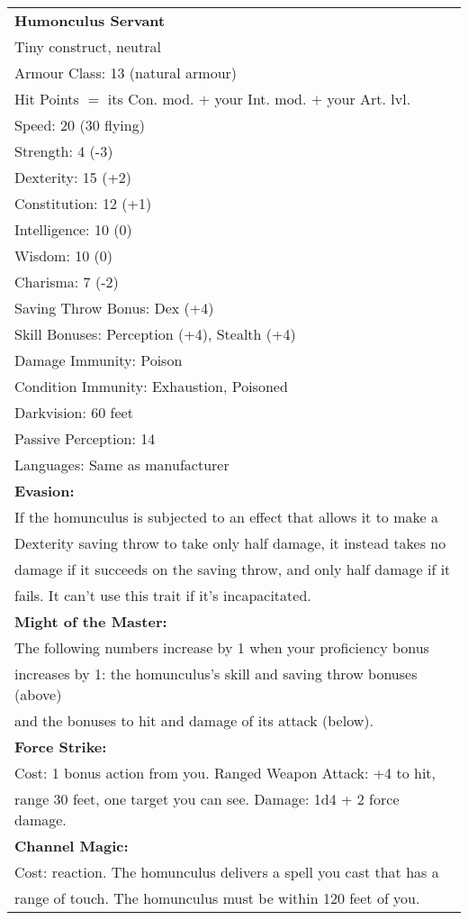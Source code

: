 \documentclass[11pt, A4paper, english]{article}
\begin{document}
			\begin{tabularx}{125.7mm}{|l|}
\hline
{\large \textbf{Humonculus Servant}} \\
Tiny construct, neutral \\
\hline
Armour Class: 13 (natural armour) \\
Hit Points $=$ its Con. mod. $+$ your Int. mod. $+$ your Art. lvl. \\
Speed: 20 (30 flying) \\
Strength: 4 (-3) \\
Dexterity: 15 (+2) \\
Constitution: 12 (+1) \\
Intelligence: 10 (0) \\
Wisdom: 10 (0) \\
Charisma: 7 (-2) \\
Saving Throw Bonus: Dex (+4) \\
Skill Bonuses: Perception (+4), Stealth (+4) \\
Damage Immunity: Poison \\
Condition Immunity: Exhaustion, Poisoned \\
Darkvision: 60 feet \\
Passive Perception: 14 \\
Languages: Same as manufacturer \\
\textbf{Evasion:} \\
If the homunculus is subjected to an effect that allows it to make a \\
Dexterity saving throw to take only half damage, it instead takes no \\
damage if it succeeds on the saving throw, and only half damage if it \\
fails. It can't use this trait if it’s incapacitated. \\
\textbf{Might of the Master:} \\
The following numbers increase by 1 when your proficiency bonus \\
increases by 1: the homunculus's skill and saving throw bonuses (above) \\
and the bonuses to hit and damage of its attack (below). \\
\textbf{Force Strike:} \\
Cost: 1 bonus action from you. Ranged Weapon Attack: +4 to hit, \\
range 30 feet, one target you can see. Damage: 1d4 + 2 force damage. \\
\textbf{Channel Magic:} \\
Cost: reaction. The homunculus delivers a spell you cast that has a \\
range of touch. The homunculus must be within 120 feet of you. \\
\hline
			\end{tabularx}
\end{document}

